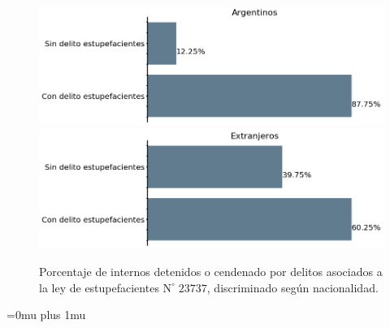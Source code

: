 \documentclass[10pt]{article}
\begin{document}
\begin{figure}[H]
	\centering
\includegraphics[scale=0.25]{graficos/estupefacientes_bar_argentinos.png}
\includegraphics[scale=0.25]{graficos/estupefacientes_bar_extranjeros.png}
	\caption{Porcentaje de internos detenidos o cendenado por delitos asociados a la ley de estupefacientes $\mathrm{N}^{\circ}\; 23737$, discriminado seg\'un nacionalidad.\label{estupefacientes_discriminado}}
\end{figure}

\Urlmuskip=0mu plus 1mu\relax


\end{document}
